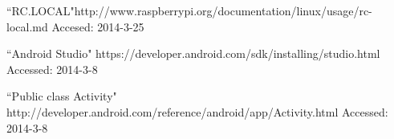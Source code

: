 \begin{thebibliography}{9}
``RC.LOCAL"http://www.raspberrypi.org/documentation/linux/usage/rc-local.md Accesed: 2014-3-25

``Android Studio" https://developer.android.com/sdk/installing/studio.html Accessed: 2014-3-8



``Public class Activity"
http://developer.android.com/reference/android/app/Activity.html Accessed: 2014-3-8
















































\end{thebibliography}
